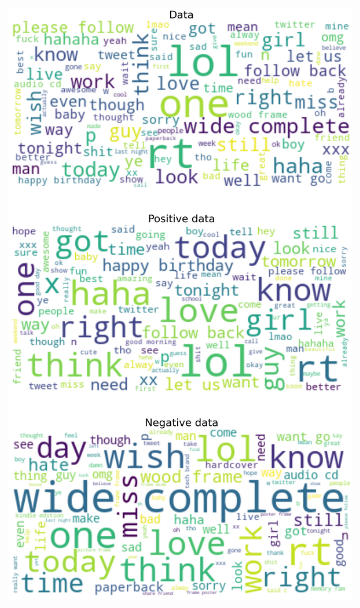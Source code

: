 \documentclass{article}
\begin{document}
\begin{itemize}
\begin{figure}[H]
\begin{subfigure}[b]{0.24\textwidth}
\includegraphics[width=\textwidth]{chapter-06/section-01-01/15/visualization/3/wordcloud.png}
\end{subfigure}
\begin{subfigure}[b]{0.24\textwidth}
\centering

\end{subfigure}
\end{figure}
\end{itemize}
\end{document}
